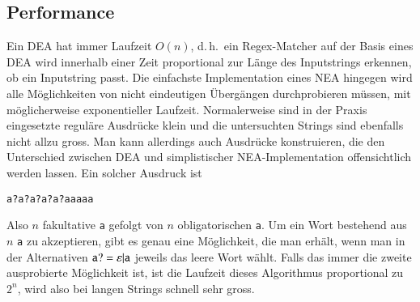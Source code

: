 \subsection{Performance}
%
%
Ein DEA hat immer Laufzeit $O(n)$, d.\,h.~ein Regex-Matcher auf der
Basis eines DEA wird innerhalb einer Zeit proportional zur
Länge des Inputstrings erkennen, ob ein Inputstring passt.
Die einfachste Implementation eines NEA hingegen wird alle Möglichkeiten
von nicht eindeutigen Übergängen durchprobieren müssen, mit
möglicherweise exponentieller Laufzeit.
Normalerweise sind in der
Praxis eingesetzte reguläre Ausdrücke klein und die untersuchten
Strings sind ebenfalls nicht allzu gross.
Man kann allerdings auch
Ausdrücke konstruieren, die den Unterschied zwischen DEA und simplistischer
NEA-Implementation offensichtlich werden lassen.
Ein solcher Ausdruck ist
\begin{center}
\tt a?a?a?a?a?aaaaa
\end{center}
Also $n$ fakultative {\tt a} gefolgt von $n$ obligatorischen {\tt a}.
Um ein Wort bestehend aus $n$ {\tt a} zu akzeptieren, gibt es genau eine
Möglichkeit, die man erhält, wenn man in der Alternativen
${\tt a?} = \varepsilon|{\tt a}$
jeweils das leere Wort wählt.
Falls das immer die zweite ausprobierte 
Möglichkeit ist, ist die Laufzeit dieses Algorithmus proportional zu
$2^n$, wird also bei langen Strings schnell sehr gross.

